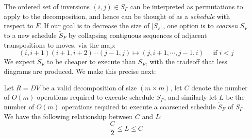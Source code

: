 \documentclass{siamart190516}
\begin{document}
The ordered set of inversions $(i,j) \in S_F$ can be interpreted as permutations to apply to the decomposition, and hence 
can be thought of as a \emph{schedule} with respect to $F$. 
If our goal is to decrease the size of $\lvert S_F \rvert$, one option is to \emph{coarsen} $S_F$ to a new schedule $\widetilde{S}_F$ by collapsing contiguous sequences of adjacent transpositions to moves, via the map:
\begin{equation}\label{eq:tr_to_mv}
	 (i, i+1)(i+1, i+2)\cdots(j-1, j) \mapsto (j, i+1, \cdots, j-1, i)  \quad \text{ if } i < j
\end{equation}
We expect $\widetilde{S}_F$ to be cheaper to execute than $S_F$, with the tradeoff  that less diagrams are produced.
We make this precise next:
\begin{proposition}\label{prop:factor2}
	Let $R = D V$ be a valid decomposition of size $(m \times m)$, let $C$ denote the number of $O(m)$ operations required to execute schedule $S_F$, and similarly let $L$ be the number of $O(m)$ operations required to execute a coarsened schedule $\widetilde{S}_F$ of $S_F$. We have the following relationship between $C$ and $L$:
	$$ \frac{C}{2} \leq L \leq C$$ 
\end{proposition}
\end{document}
